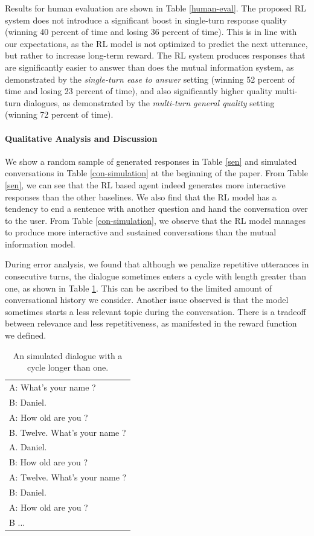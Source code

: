Results for human evaluation are shown in Table \ref{human-eval}. 
The proposed RL system does not introduce a significant boost in single-turn response quality (winning 40 percent of time and losing 36 percent of time).
This is in line with our expectations, 
as the RL model is not optimized to predict the next utterance, but rather to increase long-term reward.
The RL system produces responses that are significantly easier to answer than 
does the mutual information system, as demonstrated by the {\it single-turn ease to answer} setting (winning 52 percent of time and losing 23 percent of time),
and also significantly higher quality multi-turn dialogues, as demonstrated by the {\it multi-turn general quality} setting (winning 72 percent of time).



\paragraph{Qualitative Analysis and Discussion}
We show a random sample of generated responses in Table \ref{sen} and simulated conversations in Table \ref{con-simulation} at the beginning of the paper.
From Table \ref{sen}, we can see that the RL based agent indeed generates more interactive responses than the other baselines. We also find that the RL model has a tendency to 
end a sentence with another question and hand the conversation over to the user. 
From Table \ref{con-simulation}, we observe that the RL model manages to produce more interactive and sustained conversations than the mutual information model. 

During error analysis, we found that although we penalize repetitive utterances in consecutive turns, the dialogue sometimes enters a cycle with length greater than one, as shown in Table \ref{he}. This can be ascribed to the 
limited amount of conversational history we consider. 
Another issue observed is that the model sometimes starts a less relevant topic during the conversation. There is a tradeoff between relevance and less repetitiveness, as manifested in the reward function we defined. 

\begin{table}[!ht]
\centering
\small
\begin{tabular}{l}\toprule
A: What's your name ?\\
B: Daniel.  \\
A: How old are you ?\\
B. Twelve. What's your name ? \\
A. Daniel.  \\
B: How old are you ? \\
A: Twelve. What's your name ? \\
B: Daniel.\\
A: How old are you ? \\
B ... \\\bottomrule
\end{tabular}
\caption{An simulated dialogue with a cycle longer than one.}
\label{he}
\end{table}

